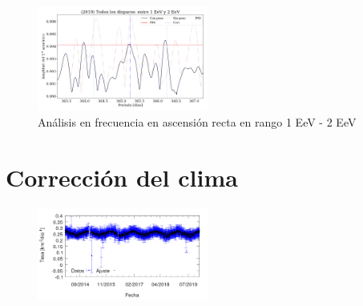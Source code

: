 \begin{figure}[H]
	\centering
	\includegraphics[width=0.5\textwidth]{2019_AllTriggers_1_2_EeV_con_vs_sin_peso.png}
	\caption{Análisis en frecuencia en ascensión recta en rango 1 EeV - 2 EeV}
	\label{fig:consin}
\end{figure}


\section{Corrección del clima}

\begin{figure}[H]
	\centering
	\includegraphics[width=0.5\textwidth]{rate_Ajuste.png}
\end{figure}

